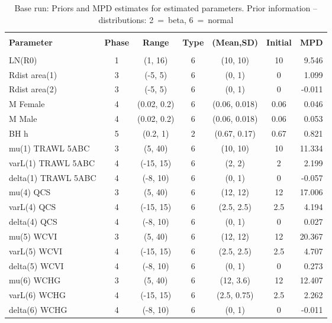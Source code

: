 \setlength{\tabcolsep}{2pt}
\begin{table}[!h]
\centering
\caption{Base run: Priors and MPD estimates for estimated parameters. Prior information -- distributions: 2~=~beta, 6~=~normal}
\label{tab:pop.parest}
\usefont{\encodingdefault}{\familydefault}{\seriesdefault}{\shapedefault}\small
\begin{tabular}{lcccccr}
\hline \\ [-1.5ex]
{\bf Parameter} & {\bf Phase} & {\bf Range} & {\bf Type} & {\bf (Mean,SD)} & {\bf Initial} & {\bf MPD} \\ [1ex]
\hline \\ [-1.5ex]
LN(R0) & 1 & (1, 16) & 6 & (10, 10) & 10 & 9.546 \\
Rdist area(1) & 3 & (-5, 5) & 6 & (0, 1) & 0 & 1.099 \\
Rdist area(2) & 3 & (-5, 5) & 6 & (0, 1) & 0 & -0.011 \\
M Female & 4 & (0.02, 0.2) & 6 & (0.06, 0.018) & 0.06 & 0.046 \\
M Male & 4 & (0.02, 0.2) & 6 & (0.06, 0.018) & 0.06 & 0.053 \\
BH h & 5 & (0.2, 1) & 2 & (0.67, 0.17) & 0.67 & 0.821 \\
mu(1) TRAWL 5ABC & 3 & (5, 40) & 6 & (10, 10) & 10 & 11.334 \\
varL(1) TRAWL 5ABC & 4 & (-15, 15) & 6 & (2, 2) & 2 & 2.199 \\
delta(1) TRAWL 5ABC & 4 & (-8, 10) & 6 & (0, 1) & 0 & -0.057 \\
mu(4) QCS & 3 & (5, 40) & 6 & (12, 12) & 12 & 17.006 \\
varL(4) QCS & 4 & (-15, 15) & 6 & (2.5, 2.5) & 2.5 & 4.194 \\
delta(4) QCS & 4 & (-8, 10) & 6 & (0, 1) & 0 & 0.027 \\
mu(5) WCVI & 3 & (5, 40) & 6 & (12, 12) & 12 & 20.367 \\
varL(5) WCVI & 4 & (-15, 15) & 6 & (2.5, 2.5) & 2.5 & 4.707 \\
delta(5) WCVI & 4 & (-8, 10) & 6 & (0, 1) & 0 & 0.273 \\
mu(6) WCHG & 3 & (5, 40) & 6 & (12, 3.6) & 12 & 12.407 \\
varL(6) WCHG & 4 & (-15, 15) & 6 & (2.5, 0.75) & 2.5 & 2.262 \\
delta(6) WCHG & 4 & (-8, 10) & 6 & (0, 1) & 0 & -0.011 \\

\end{tabular}
\end{table}
